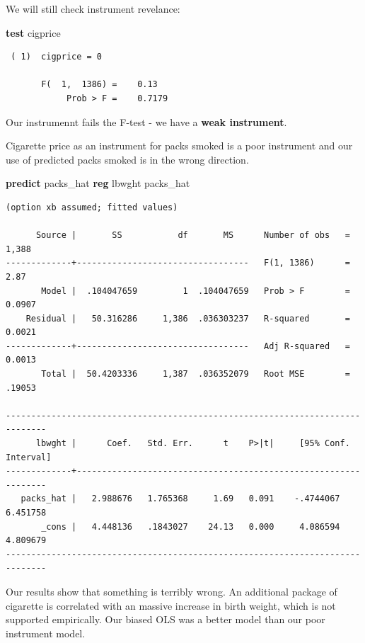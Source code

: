 \documentclass[
]{book}
\newenvironment{Shaded}{\begin{snugshade}}{\end{snugshade}}
\newcommand{\KeywordTok}[1]{\textcolor[rgb]{0.13,0.29,0.53}{\textbf{#1}}}
\newcommand{\NormalTok}[1]{#1}
\begin{document}
We will still check instrument revelance:

\begin{Shaded}
\begin{Highlighting}[]
\KeywordTok{test}\NormalTok{ cigprice}
\end{Highlighting}
\end{Shaded}

\begin{verbatim}
 ( 1)  cigprice = 0

       F(  1,  1386) =    0.13
            Prob > F =    0.7179
\end{verbatim}

Our instrumennt fails the F-test - we have a \textbf{weak instrument}.

Cigarette price as an instrument for packs smoked is a poor instrument and our use of predicted packs smoked is in the wrong direction.

\begin{Shaded}
\begin{Highlighting}[]
\KeywordTok{predict}\NormalTok{ packs\_hat}
\KeywordTok{reg}\NormalTok{ lbwght packs\_hat}
\end{Highlighting}
\end{Shaded}

\begin{verbatim}
(option xb assumed; fitted values)

      Source |       SS           df       MS      Number of obs   =     1,388
-------------+----------------------------------   F(1, 1386)      =      2.87
       Model |  .104047659         1  .104047659   Prob > F        =    0.0907
    Residual |   50.316286     1,386  .036303237   R-squared       =    0.0021
-------------+----------------------------------   Adj R-squared   =    0.0013
       Total |  50.4203336     1,387  .036352079   Root MSE        =    .19053

------------------------------------------------------------------------------
      lbwght |      Coef.   Std. Err.      t    P>|t|     [95% Conf. Interval]
-------------+----------------------------------------------------------------
   packs_hat |   2.988676   1.765368     1.69   0.091    -.4744067    6.451758
       _cons |   4.448136   .1843027    24.13   0.000     4.086594    4.809679
------------------------------------------------------------------------------
\end{verbatim}

Our results show that something is terribly wrong. An additional package of cigarette is correlated with an massive increase in birth weight, which is not supported empirically. Our biased OLS was a better model than our poor instrument model.
\end{document}
